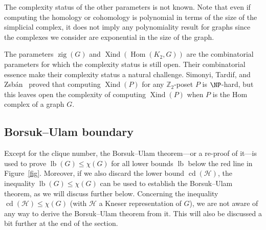 \documentclass[12pt]{amsart}
\newtheorem{theorem}{Theorem}[section]
\theoremstyle{definition}
\newtheorem{question}{Question}
\def\Z{\mathbb{Z}}
\def\HH{\mathcal{H}}
\renewcommand{\geq}{\geqslant}
\renewcommand{\leq}{\leqslant}
\def\Hom{\operatorname{Hom}}
\def\Xind{\operatorname{Xind}}
\def\cd{\operatorname{cd}}
\def\zig{\operatorname{zig}}
\def\lb{\operatorname{lb}}
\begin{document}
The complexity status of the other parameters is not known. Note that even if computing the homology or cohomology is polynomial in terms of the size of the simplicial complex, it does not imply any polynomiality result for graphs since the complexes we consider are exponential in the size of the graph. 

The parameters $\zig(G)$ and $\Xind(\Hom(K_2,G))$ are the combinatorial parameters for which the complexity status is still open. Their combinatorial essence make their complexity status a natural challenge. Simonyi, Tardif, and Zsb\'an~\cite{simonyi2013colourful} proved that computing $\Xind(P)$ for any $\Z_2$-poset $P$ is $\NP$-hard, but this leaves open the complexity of computing $\Xind(P)$ when $P$ is the Hom complex of a graph $G$. \label{page:compl}






\subsection{Borsuk--Ulam boundary}\label{subsec:BU} Except for the clique number, the Borsuk--Ulam theorem---or a re-proof of it---is used to prove $\lb(G) \leq \chi(G)$ for all lower bounds $\lb$ below the red line in Figure~\ref{fig}. Moreover, if we also discard the lower bound $\cd(\HH)$, the inequality $\lb(G) \leq \chi(G)$ can be used to establish the Borsuk--Ulam theorem, as we will discuss further below. Concerning the inequality $\cd(\HH) \leq \chi(G)$ (with $\HH$ a Kneser representation of $G$), we are not aware of any way to derive the Borsuk--Ulam theorem from it. This will also be discussed a bit further at the end of the section.
\end{document}
